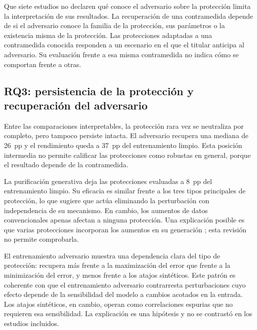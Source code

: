 Que siete estudios no declaren qué conoce el adversario sobre la protección limita la interpretación de sus resultados. La recuperación de una contramedida depende de si el adversario conoce la familia de la protección, sus parámetros o la existencia misma de la protección. Las protecciones adaptadas a una contramedida conocida responden a un escenario en el que el titular anticipa al adversario. Su evaluación frente a esa misma contramedida no indica cómo se comportan frente a otras.

\subsection{RQ3: persistencia de la protección y recuperación del adversario}

Entre las comparaciones interpretables, la protección rara vez se neutraliza por completo, pero tampoco persiste intacta. El adversario recupera una mediana de 26~pp y el rendimiento queda a 37~pp del entrenamiento limpio. Esta posición intermedia no permite calificar las protecciones como robustas en general, porque el resultado depende de la contramedida.

La purificación generativa deja las protecciones evaluadas a 8~pp del entrenamiento limpio. Su eficacia es similar frente a los tres tipos principales de protección, lo que sugiere que actúa eliminando la perturbación con independencia de su mecanismo. En cambio, los aumentos de datos convencionales apenas afectan a ninguna protección. Una explicación posible es que varias protecciones incorporan los aumentos en su generación \cite{S0090,S0095}; esta revisión no permite comprobarla.

El entrenamiento adversario muestra una dependencia clara del tipo de protección: recupera más frente a la maximización del error que frente a la minimización del error, y menos frente a los atajos sintéticos. Este patrón es coherente con que el entrenamiento adversario contrarresta perturbaciones cuyo efecto depende de la sensibilidad del modelo a cambios acotados en la entrada. Los atajos sintéticos, en cambio, operan como correlaciones espurias que no requieren esa sensibilidad. La explicación es una hipótesis y no se contrastó en los estudios incluidos.

